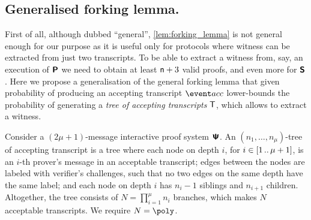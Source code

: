 \documentclass[runningheads,10pt]{llncs}
\begin{document}
\subsection{Generalised forking lemma.}
First of all, although dubbed ``general'', \cref{lem:forking_lemma} is not
general enough for our purpose as it is useful only for protocols where witness
can be extracted from just two transcripts. To be able to extract a witness
from, say, an execution of $\bm{\mathsf{P}}$ we need to obtain at least
$\mathsf{n} + 3$ valid proofs, and even more for $\bm{\mathsf{S}}$. Here we
propose a generalisation of the general forking lemma that given probability of
producing an accepting transcript $\accProb$ lower-bounds the probability of
generating a \emph{tree of accepting transcripts} $\mathsf{T}$, which allows to
extract a witness.

\begin{definition}
	\label{def:tree_of_accepting_transcripts}
	Consider a $(2\mu + 1)$-message interactive proof system $\bm{\mathsf{\Psi}}$. An $(n_1,
  \ldots, n_\mu)$-tree of accepting transcript is a tree where each node on
  depth $i$, for $i \in [1 \, .. \, \mu + 1]$, is an $i$-th prover's message in an
  acceptable transcript; edges between the nodes are labeled with verifier's
  challenges, such that no two edges on the same depth have the same
  label; and each node on depth $i$ has $n_{i} - 1$ siblings and $n_{i +
    1}$ children. Altogether, the tree consists of $N = \prod_{i = 1}^\mu n_i$
  branches, which makes $N$ acceptable transcripts. We require $N = \poly$.
\end{definition}
\end{document}

